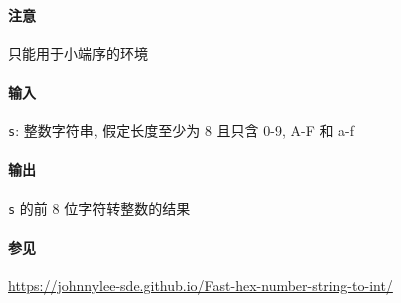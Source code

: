 \paragraph{注意}

只能用于小端序的环境

\paragraph{输入}

\verb|s|: 整数字符串, 假定长度至少为 8 且只含 0-9, A-F 和 a-f

\paragraph{输出}

\verb|s| 的前 8 位字符转整数的结果

\paragraph{参见}

\url{https://johnnylee-sde.github.io/Fast-hex-number-string-to-int/}
